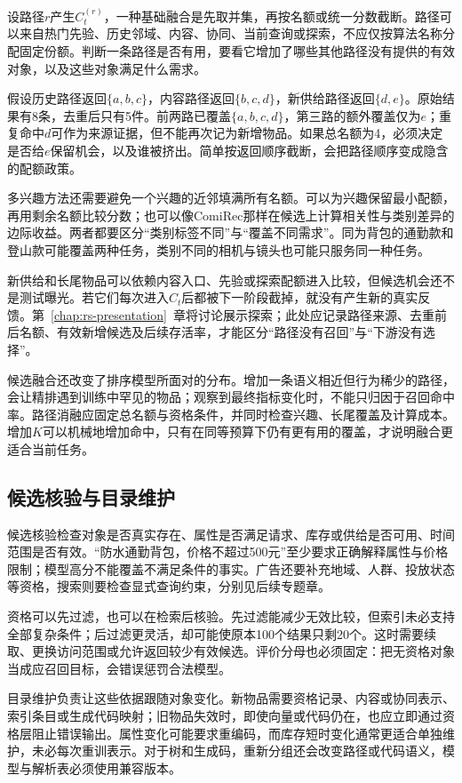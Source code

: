 设路径$r$产生$C_t^{(r)}$，一种基础融合是先取并集，再按名额或统一分数截断。路径可以来自热门先验、历史邻域、内容、协同、当前查询或探索，不应仅按算法名称分配固定份额。判断一条路径是否有用，要看它增加了哪些其他路径没有提供的有效对象，以及这些对象满足什么需求。

假设历史路径返回$\{a,b,c\}$，内容路径返回$\{b,c,d\}$，新供给路径返回$\{d,e\}$。原始结果有8条，去重后只有5件。前两路已覆盖$\{a,b,c,d\}$，第三路的额外覆盖仅为$e$；重复命中$d$可作为来源证据，但不能再次记为新增物品。如果总名额为4，必须决定是否给$e$保留机会，以及谁被挤出。简单按返回顺序截断，会把路径顺序变成隐含的配额政策。

多兴趣方法还需要避免一个兴趣的近邻填满所有名额。可以为兴趣保留最小配额，再用剩余名额比较分数；也可以像ComiRec那样在候选上计算相关性与类别差异的边际收益。两者都要区分“类别标签不同”与“覆盖不同需求”。同为背包的通勤款和登山款可能覆盖两种任务，类别不同的相机与镜头也可能只服务同一种任务。

新供给和长尾物品可以依赖内容入口、先验或探索配额进入比较，但候选机会还不是测试曝光。若它们每次进入$C_t$后都被下一阶段截掉，就没有产生新的真实反馈。第~\ref{chap:rs-presentation}~章将讨论展示探索；此处应记录路径来源、去重前后名额、有效新增候选及后续存活率，才能区分“路径没有召回”与“下游没有选择”。

候选融合还改变了排序模型所面对的分布。增加一条语义相近但行为稀少的路径，会让精排遇到训练中罕见的物品；观察到最终指标变化时，不能只归因于召回命中率。路径消融应固定总名额与资格条件，并同时检查兴趣、长尾覆盖及计算成本。增加$K$可以机械地增加命中，只有在同等预算下仍有更有用的覆盖，才说明融合更适合当前任务。

\subsection{候选核验与目录维护}
\label{sec:rs-candidate-maintenance}

候选核验检查对象是否真实存在、属性是否满足请求、库存或供给是否可用、时间范围是否有效。“防水通勤背包，价格不超过500元”至少要求正确解释属性与价格限制；模型高分不能覆盖不满足条件的事实。广告还要补充地域、人群、投放状态等资格，搜索则要检查显式查询约束，分别见后续专题章。

资格可以先过滤，也可以在检索后核验。先过滤能减少无效比较，但索引未必支持全部复杂条件；后过滤更灵活，却可能使原本100个结果只剩20个。这时需要续取、更换访问范围或允许返回较少有效候选。评价分母也必须固定：把无资格对象当成应召回目标，会错误惩罚合法模型。

目录维护负责让这些依据跟随对象变化。新物品需要资格记录、内容或协同表示、索引条目或生成代码映射；旧物品失效时，即使向量或代码仍在，也应立即通过资格层阻止错误输出。属性变化可能要求重编码，而库存短时变化通常更适合单独维护，未必每次重训表示。对于树和生成码，重新分组还会改变路径或代码语义，模型与解析表必须使用兼容版本。

